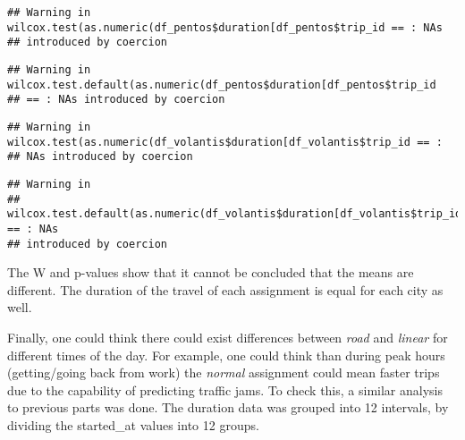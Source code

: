 \documentclass[
]{article}
\newenvironment{Shaded}{\begin{snugshade}}{\end{snugshade}}
\newcommand{\AttributeTok}[1]{\textcolor[rgb]{0.77,0.63,0.00}{#1}}
\newcommand{\CommentTok}[1]{\textcolor[rgb]{0.56,0.35,0.01}{\textit{#1}}}
\newcommand{\FunctionTok}[1]{\textcolor[rgb]{0.00,0.00,0.00}{#1}}
\newcommand{\NormalTok}[1]{#1}
\newcommand{\SpecialCharTok}[1]{\textcolor[rgb]{0.00,0.00,0.00}{#1}}
\newcommand{\StringTok}[1]{\textcolor[rgb]{0.31,0.60,0.02}{#1}}
\begin{document}
\begin{verbatim}
## Warning in wilcox.test(as.numeric(df_pentos$duration[df_pentos$trip_id == : NAs
## introduced by coercion
\end{verbatim}

\begin{verbatim}
## Warning in wilcox.test.default(as.numeric(df_pentos$duration[df_pentos$trip_id
## == : NAs introduced by coercion
\end{verbatim}

\begin{Shaded}
\end{Shaded}

\begin{verbatim}
## Warning in wilcox.test(as.numeric(df_volantis$duration[df_volantis$trip_id == :
## NAs introduced by coercion
\end{verbatim}

\begin{verbatim}
## Warning in
## wilcox.test.default(as.numeric(df_volantis$duration[df_volantis$trip_id == : NAs
## introduced by coercion
\end{verbatim}

The W and p-values show that it cannot be concluded that the means are
different. The duration of the travel of each assignment is equal for
each city as well.

Finally, one could think there could exist differences between
\emph{road} and \emph{linear} for different times of the day. For
example, one could think than during peak hours (getting/going back from
work) the \emph{normal} assignment could mean faster trips due to the
capability of predicting traffic jams. To check this, a similar analysis
to previous parts was done. The duration data was grouped into 12
intervals, by dividing the started\_at values into 12 groups.
\end{document}
